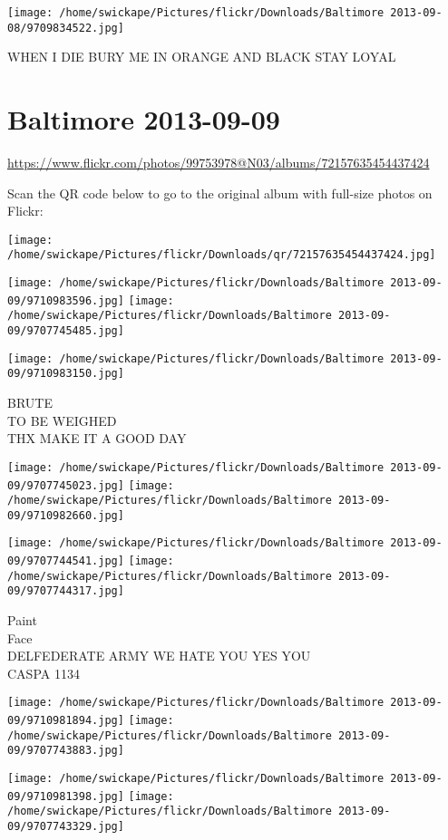 \documentclass[10pt,letterpaper]{article}
\begin{document}
\texttt{[image: /home/swickape/Pictures/flickr/Downloads/Baltimore 2013-09-08/9709834522.jpg]}

WHEN I DIE BURY ME IN ORANGE AND BLACK STAY LOYAL
\pagebreak

\section*{Baltimore 2013-09-09}

\url{https://www.flickr.com/photos/99753978@N03/albums/72157635454437424}

Scan the QR code below to go to the original album with full-size photos on Flickr:

\texttt{[image: /home/swickape/Pictures/flickr/Downloads/qr/72157635454437424.jpg]}
\pagebreak

\texttt{[image: /home/swickape/Pictures/flickr/Downloads/Baltimore 2013-09-09/9710983596.jpg]}
\texttt{[image: /home/swickape/Pictures/flickr/Downloads/Baltimore 2013-09-09/9707745485.jpg]}

\vspace{0.25in}
\texttt{[image: /home/swickape/Pictures/flickr/Downloads/Baltimore 2013-09-09/9710983150.jpg]}

BRUTE\\
TO BE WEIGHED\\
THX MAKE IT A GOOD DAY
\pagebreak

\texttt{[image: /home/swickape/Pictures/flickr/Downloads/Baltimore 2013-09-09/9707745023.jpg]}
\texttt{[image: /home/swickape/Pictures/flickr/Downloads/Baltimore 2013-09-09/9710982660.jpg]}

\texttt{[image: /home/swickape/Pictures/flickr/Downloads/Baltimore 2013-09-09/9707744541.jpg]}
\texttt{[image: /home/swickape/Pictures/flickr/Downloads/Baltimore 2013-09-09/9707744317.jpg]}

Paint\\
Face\\
DELFEDERATE ARMY WE HATE YOU YES YOU\\
CASPA 1134
\pagebreak

\texttt{[image: /home/swickape/Pictures/flickr/Downloads/Baltimore 2013-09-09/9710981894.jpg]}
\texttt{[image: /home/swickape/Pictures/flickr/Downloads/Baltimore 2013-09-09/9707743883.jpg]}

\texttt{[image: /home/swickape/Pictures/flickr/Downloads/Baltimore 2013-09-09/9710981398.jpg]}
\texttt{[image: /home/swickape/Pictures/flickr/Downloads/Baltimore 2013-09-09/9707743329.jpg]}
\end{document}
